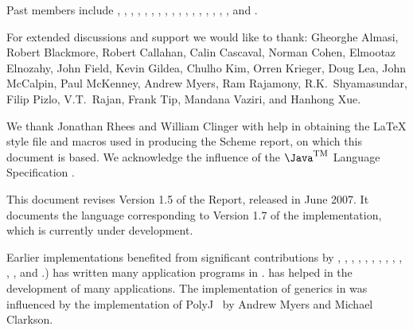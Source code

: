 Past members include
, 
, 
, 
, 
, 
, 
, 
,
, 
, 
, 
, 
,
,  
, 
,
, and
.

For extended discussions and support we would like to thank: 
Gheorghe Almasi,
Robert Blackmore,
Robert Callahan, 
Calin Cascaval, 
Norman Cohen, 
Elmootaz Elnozahy, 
John Field,
Kevin Gildea,
Chulho Kim,
Orren Krieger, 
Doug Lea, 
John McCalpin, 
Paul McKenney, 
Andrew Myers,
Ram Rajamony,
R.K.~Shyamasundar, 
Filip Pizlo, 
V.T.~Rajan, 
Frank Tip, Mandana Vaziri, and Hanhong Xue.

We thank Jonathan Rhees and William Clinger with help in obtaining the
\LaTeX{} style file and macros used in producing the Scheme report,
on which this document is based. We acknowledge the influence of
the $\mbox{\Java}^{\mbox{\textsc{tm}}}$ Language
Specification \cite{jls2}.

This document revises Version 1.5 of the Report, released in
June 2007.  It documents the language corresponding to Version
1.7 of the implementation, which is currently under development.

Earlier implementations benefited from significant contributions by
, 
, 
, 
,
,
,  
,  
,
, 
,  
, 
, and
.)
 has written many application programs
in \Xten{}.  has helped in the
development of many applications.
The implementation of generics in \Xten{} was influenced by the
implementation of PolyJ~\cite{polyj} by Andrew Myers and Michael Clarkson.

